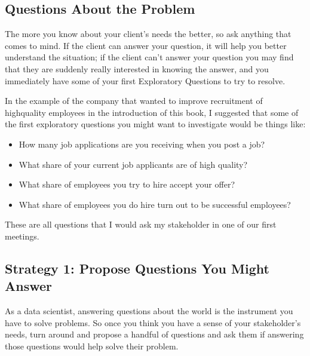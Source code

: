\documentclass[letterpaper,10pt,english]{jupyterBook}
\begin{document}
\subsection{Questions About the Problem}
\label{\detokenize{20_problems_to_questions/20_stakeholder_management:questions-about-the-problem}}
\sphinxAtStartPar
The more you know about your client’s needs the better, so ask anything that comes to mind. If the client can answer your question, it will help you better understand the situation; if the client can’t answer your question you may find that they are suddenly really interested in knowing the answer, and you immediately have some of your first Exploratory Questions to try to resolve.

\sphinxAtStartPar
In the example of the company that wanted to improve recruitment of high\sphinxhyphen{}quality employees in the introduction of this book, I suggested that some of the first exploratory questions you might want to investigate would be things like:
\begin{itemize}
\item {} 
\sphinxAtStartPar
How many job applications are you receiving when you post a job?

\item {} 
\sphinxAtStartPar
What share of your current job applicants are of high quality?

\item {} 
\sphinxAtStartPar
What share of employees you try to hire accept your offer?

\item {} 
\sphinxAtStartPar
What share of employees you do hire turn out to be successful employees?

\end{itemize}

\sphinxAtStartPar
These are all questions that I would ask my stakeholder in one of our first meetings.


\subsection{Strategy 1: Propose Questions You Might Answer}
\label{\detokenize{20_problems_to_questions/20_stakeholder_management:strategy-1-propose-questions-you-might-answer}}
\sphinxAtStartPar
As a data scientist, answering questions about the world is the instrument you have to solve problems. So once you think you have a sense of your stakeholder’s needs, turn around and propose a handful of questions and ask them if answering those questions would help solve their problem.
\end{document}
